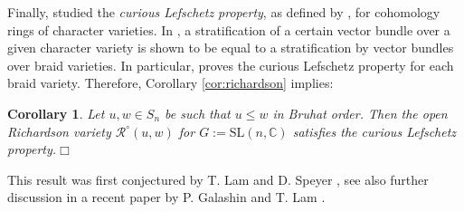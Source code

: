 \documentclass[10pt]{amsart}
\theoremstyle{plain}
\newtheorem{cor}[thm]{Corollary}
\theoremstyle{definition}
\theoremstyle{remark}
\numberwithin{equation}{section}
\newcommand{\C}{\mathbb{C}}
\renewcommand{\C}{\mathbb{C}}
\newcommand{\HHH}{\mathrm{HHH}}
\newcommand{\Br}{\mathrm{Br}}
\newcommand{\rich}[2]{\mathcal{R}^{\circ}\!(#2,#1)}
\newcommand{\MG}[1]{{\color{teal}{{\bf Misha}: #1}}}
\DeclareRobustCommand{\ateb}{\text{\reflectbox{$\beta$}}}
\begin{document}

Finally, \cite{Mellit} studied the \emph{curious Lefschetz property}, as defined by \cite{HRV}, for cohomology rings of character varieties. In \cite{Mellit}, a stratification of a certain vector bundle over a given character variety is shown to be equal to a stratification by vector bundles over braid varieties. In particular, \cite{Mellit} proves the curious Lefschetz property for each braid variety. Therefore, Corollary \ref{cor:richardson} implies:

\begin{cor} Let $u, w \in S_{n}$ be such that $u \leq w$ in Bruhat order.
Then the open Richardson variety  $\rich{w}{u}$ for $G:=\mbox{SL}(n,\C)$ %
satisfies the curious Lefschetz property.\hfill$\Box$
\end{cor}

\noindent This result was first conjectured by T. Lam and D. Speyer \cite[Section 1.5.1]{LS}, see also further discussion in a recent paper by P. Galashin and T. Lam \cite{GL}. 

\end{document}
